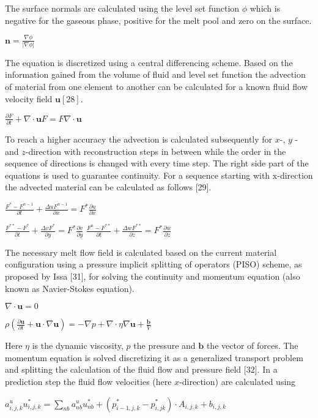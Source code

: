 \documentclass[10pt]{article}
\begin{document}
The surface normals are calculated using the level set function $\phi$ which is negative for the gaseous phase, positive for the melt pool and zero on the surface.

$\mathbf{n}=\frac{\nabla \phi}{|\nabla \phi|}$

The equation is discretized using a central differencing scheme. Based on the information gained from the volume of fluid and level set function the advection of material from one element to another can be calculated for a known fluid flow velocity field $\mathbf{u}[28]$.

$\frac{\partial F}{\partial t}+\nabla \cdot \mathbf{u} F=F \nabla \cdot \mathbf{u}$

To reach a higher accuracy the advection is calculated subsequently for $x$-, $y$ - and $z$-direction with reconstruction steps in between while the order in the sequence of directions is changed with every time step. The right side part of the equations is used to guarantee continuity. For a sequence starting with $\mathrm{x}$-direction the advected material can be calculated as follows [29].

$\frac{F^{*}-F^{n-1}}{\partial t}+\frac{\Delta u F^{n-1}}{\partial x}=F^{*} \frac{\partial u}{\partial x}$

$\frac{F^{* *}-F^{*}}{\partial t}+\frac{\Delta v F^{*}}{\partial y}=F^{*} \frac{\partial v}{\partial y}$ $\frac{F^{n}-F^{* *}}{\partial t}+\frac{\Delta w F^{* *}}{\partial z}=F^{*} \frac{\partial w}{\partial z}$

The necessary melt flow field is calculated based on the current material configuration using a pressure implicit splitting of operators (PISO) scheme, as proposed by Issa [31], for solving the continuity and momentum equation (also known as Navier-Stokes equation).

$\nabla \cdot \mathbf{u}=0$

$\rho\left(\frac{\partial \mathbf{u}}{\partial t}+\mathbf{u} \cdot \nabla \mathbf{u}\right)=-\nabla p+\nabla \cdot \eta \nabla \mathbf{u}+\frac{\mathbf{b}}{V}$

Here $\eta$ is the dynamic viscosity, $p$ the pressure and $\mathbf{b}$ the vector of forces. The momentum equation is solved discretizing it as a generalized transport problem and splitting the calculation of the fluid flow and pressure field [32]. In a prediction step the fluid flow velocities (here $x$-direction) are calculated using

$a_{i, j, k}^{u} u_{i, j, k}^{*}=\sum_{n b} a_{n b}^{u} u_{n b}^{*}+\left(p_{i-1, j, k}^{*}-p_{i, j k}^{*}\right) \cdot A_{i, j, k}+b_{i, j, k}$
\end{document}
